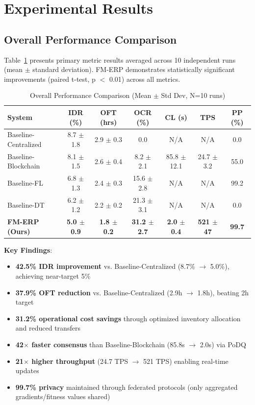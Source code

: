 \documentclass[times,10pt,twocolumn]{jucs2e}
\begin{document}

\section{Experimental Results}

\subsection{Overall Performance Comparison}

Table~\ref{tab:results} presents primary metric results averaged across 10 independent runs (mean $\pm$ standard deviation). FM-ERP demonstrates statistically significant improvements (paired t-test, p $<$ 0.01) across all metrics.

\begin{table}[h!]
\centering
\caption{Overall Performance Comparison (Mean $\pm$ Std Dev, N=10 runs)}
\label{tab:results}
\begin{tabular}{lcccccc}
\toprule
\textbf{System} & \textbf{IDR (\%)} & \textbf{OFT (hrs)} & \textbf{OCR (\%)} & \textbf{CL (s)} & \textbf{TPS} & \textbf{PP (\%)} \\
\midrule
Baseline-Centralized & 8.7 $\pm$ 1.8 & 2.9 $\pm$ 0.3 & 0.0 & N/A & N/A & 0.0 \\
Baseline-Blockchain & 8.1 $\pm$ 1.5 & 2.6 $\pm$ 0.4 & 8.2 $\pm$ 2.1 & 85.8 $\pm$ 12.1 & 24.7 $\pm$ 3.2 & 55.0 \\
Baseline-FL & 6.8 $\pm$ 1.3 & 2.4 $\pm$ 0.3 & 15.6 $\pm$ 2.8 & N/A & N/A & 99.2 \\
Baseline-DT & 6.2 $\pm$ 1.2 & 2.2 $\pm$ 0.2 & 21.3 $\pm$ 3.1 & N/A & N/A & 0.0 \\
\midrule
\textbf{FM-ERP (Ours)} & \textbf{5.0 $\pm$ 0.9} & \textbf{1.8 $\pm$ 0.2} & \textbf{31.2 $\pm$ 2.7} & \textbf{2.0 $\pm$ 0.4} & \textbf{521 $\pm$ 47} & \textbf{99.7} \\
\bottomrule
\end{tabular}
\end{table}

\textbf{Key Findings}:
\begin{itemize}
\item \textbf{42.5\% IDR improvement} vs. Baseline-Centralized (8.7\% $\rightarrow$ 5.0\%), achieving near-target 5\%
\item \textbf{37.9\% OFT reduction} vs. Baseline-Centralized (2.9h $\rightarrow$ 1.8h), beating 2h target
\item \textbf{31.2\% operational cost savings} through optimized inventory allocation and reduced transfers
\item \textbf{42$\times$ faster consensus} than Baseline-Blockchain (85.8s $\rightarrow$ 2.0s) via PoDQ
\item \textbf{21$\times$ higher throughput} (24.7 TPS $\rightarrow$ 521 TPS) enabling real-time updates
\item \textbf{99.7\% privacy} maintained through federated protocols (only aggregated gradients/fitness values shared)
\end{itemize}
\end{document}
